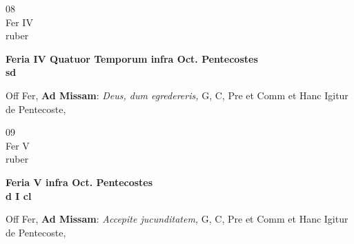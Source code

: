\documentclass[10pt, openany]{book}
\begin{document}
        \begin{center}
            \begin{minipage}{3.5in}
                \vspace{2em}
                \begin{minipage}{0.5in}
                    {\Huge 08} \\
                    {\normalsize Fer IV} \\
                    {\normalsize ruber}
                \end{minipage}
                \begin{minipage}{3.0in}
                    \textbf{ \large Feria IV Quatuor Temporum infra Oct. Pentecostes \\
                    \textnormal{\normalsize sd}} \\ 
                \end{minipage}
                \begin{justify}Off Fer, \textbf{Ad Missam}: \textit{Deus, dum egredereris,} G, C, Pre et Comm et Hanc Igitur de Pentecoste,  
                \end{justify}
            \end{minipage}
        \end{center}
    
        \begin{center}
            \begin{minipage}{3.5in}
                \vspace{2em}
                \begin{minipage}{0.5in}
                    {\Huge 09} \\
                    {\normalsize Fer V} \\
                    {\normalsize ruber}
                \end{minipage}
                \begin{minipage}{3.0in}
                    \textbf{ \large Feria V infra Oct. Pentecostes \\
                    \textnormal{\normalsize d I cl}} \\ 
                \end{minipage}
                \begin{justify}Off Fer, \textbf{Ad Missam}: \textit{Accepite jucunditatem,} G, C, Pre et Comm et Hanc Igitur de Pentecoste,  
                \end{justify}
            \end{minipage}
        \end{center}
    
\end{document}
